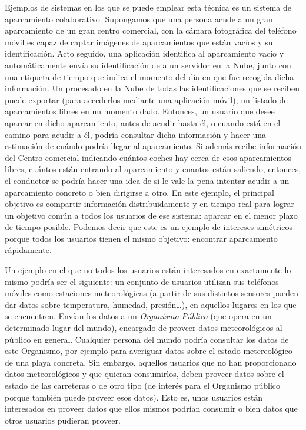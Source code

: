 Ejemplos de sistemas en los que se puede emplear esta técnica es un sistema de aparcamiento colaborativo. Supongamos que una persona acude a un gran aparcamiento de un gran centro comercial, con la cámara fotográfica del teléfono móvil es capaz de captar imágenes de aparcamientos que están vacíos y su identificación. Acto seguido, una aplicación identifica al aparcamiento vacío y automáticamente envía su identificación de a un servidor en la Nube, junto con una etiqueta de tiempo que indica el momento del día en que fue recogida dicha información. Un procesado en la Nube de todas las identificaciones que se reciben puede exportar (para accederlos mediante una aplicación móvil), un listado de aparcamientos libres en un momento dado. Entonces, un usuario que desee aparcar en dicho aparcamiento, antes de acudir hasta él, o cuando está en el camino para acudir a él, podría consultar dicha información y hacer una estimación de cuándo podría llegar al aparcamiento. Si además recibe información del Centro comercial indicando cuántos coches hay cerca de esos aparcamientos libres, cuántos están entrando al aparcamiento y cuantos están saliendo, entonces, el conductor se podría hacer una idea de si le vale la pena intentar acudir a un aparcamiento concreto o bien dirigirse a otro. En este ejemplo, el principal objetivo es compartir información distribuidamente y en tiempo real para lograr un objetivo común a todos los usuarios de ese sistema: aparcar en el menor plazo de tiempo posible. Podemos decir que este es un ejemplo de intereses simétricos porque todos los usuarios tienen el mismo objetivo: encontrar aparcamiento rápidamente.

Un ejemplo en el que no todos los usuarios están interesados en exactamente lo mismo podría ser el siguiente: un conjunto de usuarios utilizan sus teléfonos móviles como estaciones meteorológicas (a partir de sus distintos sensores pueden dar datos sobre temperatura, humedad, presión…), en aquellos lugares en los que se encuentren. Envían los datos a un \emph{Organismo Público} (que opera en un determinado lugar del mundo), encargado de proveer datos meteorológicos al público en general. Cualquier persona del mundo podría consultar los datos de este Organismo, por ejemplo para averiguar datos sobre el estado metereológico de una playa concreta. Sin embargo, aquellos usuarios que no han proporcionado datos meteorológicos y que quieran consumirlos, deben proveer datos sobre el estado de las carreteras o de otro tipo (de interés para el Organismo público porque también puede proveer esos datos). Esto es, unos usuarios están interesados en proveer datos que ellos mismos podrían consumir o bien datos que otros usuarios pudieran proveer.

